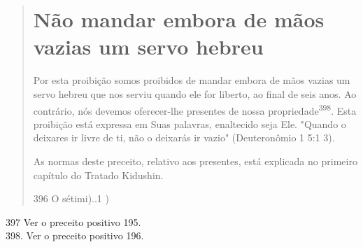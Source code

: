 \begin{quote}
\section{Não mandar embora de mãos vazias um servo hebreu}

Por esta proibição somos proibidos de mandar embora de mãos va­zias um
servo hebreu que nos serviu quando ele for liberto, ao final de seis
anos. Ao contrário, nós devemos oferecer-lhe presentes de nossa
propriedade\textsuperscript{398}. Es­ta proibição está expressa em Suas
palavras, enaltecido seja Ele. "Quando o dei­xares ir livre de ti, não o
deixarás ir vazio" (Deuteronômio 1 5:1 3).

As normas deste preceito, relativo aos presentes, está explicada no
primeiro capítulo do Tratado Kidushin.

396 O sétimi)..1 )
\end{quote}

397 Ver o preceito positivo 195.\\
398. Ver o preceito positivo 196.

